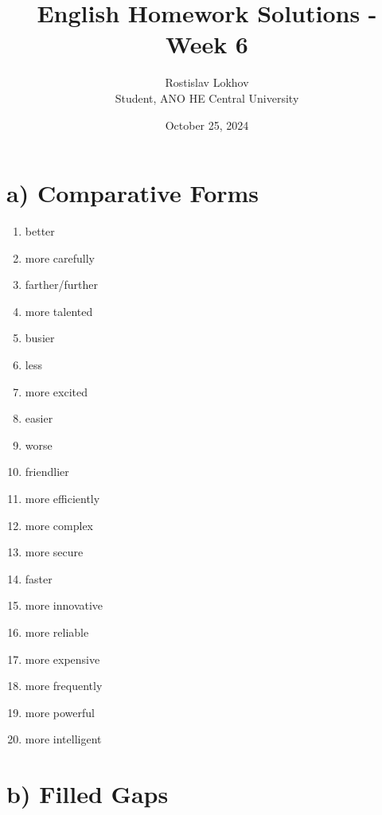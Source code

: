 \documentclass[12pt]{article}
\title{English Homework Solutions - Week 6}
\author{Rostislav Lokhov \\ Student, ANO HE Central University}
\date{October 25, 2024}
\begin{document}
\maketitle

\section*{a) Comparative Forms}

\begin{enumerate}[label=\arabic*.]
    \item better
    \item more carefully
    \item farther/further
    \item more talented
    \item busier
    \item less
    \item more excited
    \item easier
    \item worse
    \item friendlier
    \item more efficiently
    \item more complex
    \item more secure
    \item faster
    \item more innovative
    \item more reliable
    \item more expensive
    \item more frequently
    \item more powerful
    \item more intelligent
\end{enumerate}

\section*{b) Filled Gaps}
\end{document}
